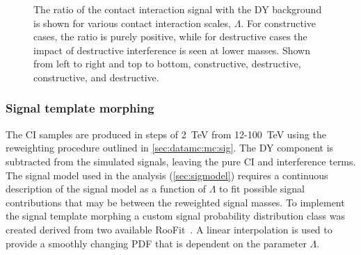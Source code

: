 \begin{figure}[]
\begin{subfigure}[b]{0.49\textwidth}
        \label{fig:datamc:sigShape4}
    \end{subfigure}
    \caption[The ratio of the contact interaction signal shape added to the Drell-Yan background (signal+DY) background to the Drell-Yan background is shown for various contact interaction scales, $\Lambda$.]{The ratio of the contact interaction signal with the DY background is shown for various contact interaction scales, $\Lambda$. For constructive cases, the ratio is purely positive, while for destructive cases the impact of destructive interference is seen at lower masses. Shown from left to right and top to bottom, \ee constructive, \ee destructive, \mumu constructive, and \mumu destructive.}
    \label{fig:datamc:sigShape}
\end{figure}

\subsubsection{Signal template morphing}\label{sec:datamc:mc:sig:morphing}
The CI samples are produced in steps of \SI{2}{\tera\electronvolt} from 12-\SI{100} {\tera\electronvolt} using the reweighting procedure outlined in \cref{sec:datamc:mc:sig}. The DY component is subtracted from the simulated signals, leaving the pure CI and interference terms. The signal model used in the analysis (\cref{sec:sigmodel}) requires a continuous description of the signal model as a function of $\Lambda$ to fit possible signal contributions that may be between the reweighted signal masses. To implement the signal template morphing a custom signal probability distribution class was created derived from two available RooFit~\cite{RooFit}. A linear interpolation is used to provide a smoothly changing PDF that is dependent on the parameter $\Lambda$.  
